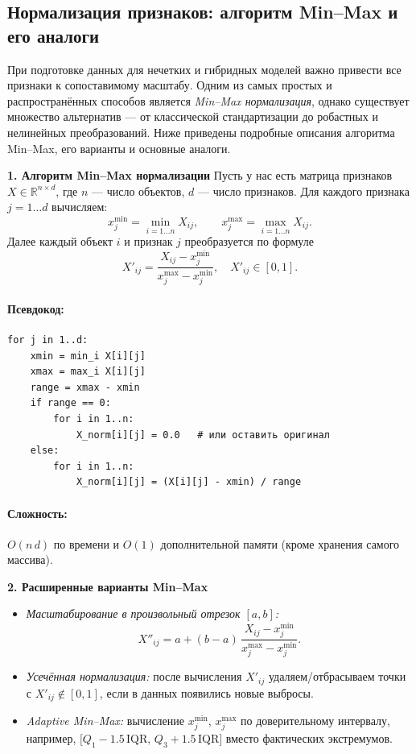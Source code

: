 \subsection{Нормализация признаков: алгоритм Min–Max и его аналоги}

При подготовке данных для нечетких и гибридных моделей важно привести все признаки к сопоставимому масштабу. Одним из самых простых и распространённых способов является \emph{Min–Max нормализация}, однако существует множество альтернатив — от классической стандартизации до робастных и нелинейных преобразований. Ниже приведены подробные описания алгоритма Min–Max, его варианты и основные аналоги.

\medskip
\noindent\textbf{1. Алгоритм Min–Max нормализации}  
Пусть у нас есть матрица признаков \(X \in \mathbb{R}^{n\times d}\), где \(n\) — число объектов, \(d\) — число признаков. Для каждого признака \(j = 1\ldots d\) вычисляем:
\[
  x_j^{\min} = \min_{i=1\ldots n} X_{i j},\qquad
  x_j^{\max} = \max_{i=1\ldots n} X_{i j}.
\]
Далее каждый объект \(i\) и признак \(j\) преобразуется по формуле
\[
  X'_{i j}
  = \frac{X_{i j} - x_j^{\min}}{x_j^{\max} - x_j^{\min}},
  \quad X'_{i j} \in [0,1].
\]
\paragraph{Псевдокод:}
\begin{verbatim}
for j in 1..d:
    xmin = min_i X[i][j]
    xmax = max_i X[i][j]
    range = xmax - xmin
    if range == 0:
        for i in 1..n:
            X_norm[i][j] = 0.0   # или оставить оригинал
    else:
        for i in 1..n:
            X_norm[i][j] = (X[i][j] - xmin) / range
\end{verbatim}
\paragraph{Сложность:} \(O(n\,d)\) по времени и \(O(1)\) дополнительной памяти (кроме хранения самого массива).

\medskip
\noindent\textbf{2. Расширенные варианты Min–Max}  
\begin{itemize}
  \item \emph{Масштабирование в произвольный отрезок \([a,b]\):}
    \[
      X''_{ij} = a + (b - a)\,\frac{X_{ij} - x_j^{\min}}{x_j^{\max} - x_j^{\min}}.
    \]
  \item \emph{Усечённая нормализация:} после вычисления \(X'_{ij}\) удаляем/отбрасываем точки с \(X'_{ij}\notin[0,1]\), если в данных появились новые выбросы.
  \item \emph{Adaptive Min–Max:} вычисление \(x_j^{\min}\), \(x_j^{\max}\) по доверительному интервалу, например, \(\bigl[Q_1 - 1.5\,\mathrm{IQR},\,Q_3 + 1.5\,\mathrm{IQR}\bigr]\) вместо фактических экстремумов.
\end{itemize}

